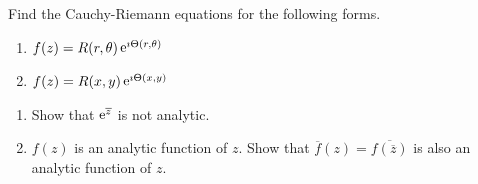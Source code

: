 {\begin{Exercise}
\end{Exercise}





\begin{Exercise}
  \label{exercise C-R polar form polar coords}
  Find the Cauchy-Riemann equations for the following forms.
  \begin{enumerate}
  \item 
    $f(z) = R(r, \theta) \mathop{\mathrm{e}}\nolimits^{\imath \Theta(r,\theta)}$
  \item 
    $f(z) = R(x,y) \mathop{\mathrm{e}}\nolimits^{\imath \Theta(x,y)}$
  \end{enumerate}

\end{Exercise}





\begin{Exercise}
  \label{exercise ol f(z)}
  \begin{enumerate}
  \item
    Show that $\mathop{\mathrm{e}}\nolimits^{\overline{z}}$ is not analytic.
  \item
    $f(z)$ is an analytic function of $z$.  Show that $\overline{f}(z)
    = \overline{f\left( \overline{z} \right)}$ is also an analytic
    function of $z$.
  \end{enumerate}

\end{Exercise}








}
